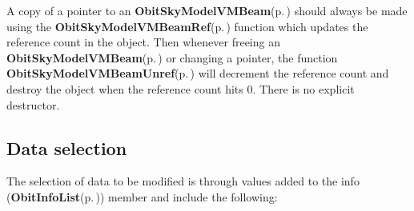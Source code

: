 A copy of a pointer to an {\bf Obit\-Sky\-Model\-VMBeam}{\rm (p.\,\pageref{structObitSkyModelVMBeam})} should always be made using the {\bf Obit\-Sky\-Model\-VMBeam\-Ref}{\rm (p.\,\pageref{ObitSkyModelVMBeam_8h_a1})} function which updates the reference count in the object. Then whenever freeing an {\bf Obit\-Sky\-Model\-VMBeam}{\rm (p.\,\pageref{structObitSkyModelVMBeam})} or changing a pointer, the function {\bf Obit\-Sky\-Model\-VMBeam\-Unref}{\rm (p.\,\pageref{ObitSkyModelVMBeam_8h_a0})} will decrement the reference count and destroy the object when the reference count hits 0. There is no explicit destructor.\subsection{Data selection}\label{ObitSkyModelVMBeam_8h_ObitSkyModelVMBeamselect}
The selection of data to be modified is through values added to the info ({\bf Obit\-Info\-List}{\rm (p.\,\pageref{structObitInfoList})}) member and include the following: \begin{itemize}

\end{itemize}
